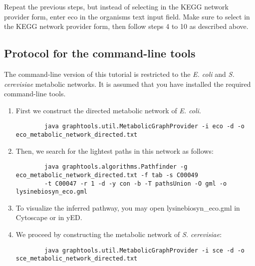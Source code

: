 Repeat the previous steps, but instead of selecting  in the KEGG network provider form, enter eco
in the organisms text input field. Make sure to select  in the KEGG network provider form,
then follow steps 4 to 10 as described above.

\subsection{Protocol for the command-line tools}

The command-line version of this tutorial is restricted to the \textit{E. coli} and \textit{S. cerevisiae}
metabolic networks. It is assumed that you have installed the required command-line tools.

\begin{enumerate}

\item First we construct the directed metabolic network of \textit{E. coli}.

        {\color{Blue} \begin{footnotesize}
		\begin{verbatim}
		java graphtools.util.MetabolicGraphProvider -i eco -d -o eco_metabolic_network_directed.txt
		\end{verbatim} \end{footnotesize}
		}

\item Then, we search for the lightest paths in this network as follows:

		{\color{Blue} \begin{footnotesize}
		\begin{verbatim}
		java graphtools.algorithms.Pathfinder -g eco_metabolic_network_directed.txt -f tab -s C00049
		-t C00047 -r 1 -d -y con -b -T pathsUnion -O gml -o lysinebiosyn_eco.gml
		\end{verbatim} \end{footnotesize}
		}

\item To visualize the inferred pathway, you may open lysinebiosyn\_eco.gml in Cytoscape or in yED.


\item We proceed by constructing the metabolic network of \textit{S. cerevisiae}:

	 {\color{Blue} \begin{footnotesize}
		\begin{verbatim}
		java graphtools.util.MetabolicGraphProvider -i sce -d -o sce_metabolic_network_directed.txt
		\end{verbatim} \end{footnotesize}
		}


\end{enumerate}
